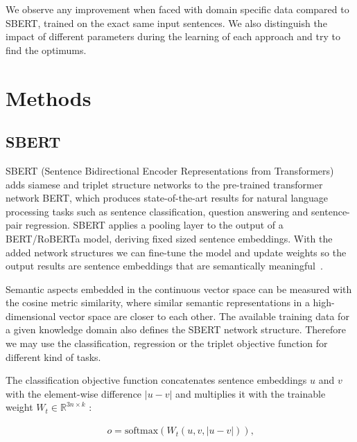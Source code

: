 \documentclass[fleqn,moreauthors,10pt]{ds_report}
\begin{document}
We observe any improvement when faced with domain specific data compared to SBERT, trained on the exact same input sentences. We also distinguish the impact of different parameters during the learning of each approach and try to find the optimums.






\section*{Methods}

\subsection*{SBERT}
SBERT (Sentence Bidirectional Encoder Representations from Transformers) adds siamese and triplet structure networks to the pre-trained transformer network BERT, which produces state-of-the-art results for natural language processing tasks such as sentence classification, question answering and sentence-pair regression. SBERT applies a pooling layer to the output of a BERT/RoBERTa model, deriving fixed sized sentence embeddings. With the added network structures we can fine-tune the model and update weights so the output results are sentence embeddings that are semantically meaningful~\cite{SBERT}.

Semantic aspects embedded in the continuous vector space can be measured with the cosine metric similarity, where similar semantic representations in a high-dimensional vector space are closer to each other. The available training data for a given knowledge domain also defines the SBERT network structure. Therefore we may use the classification, regression or the triplet objective function for different kind of tasks.

The classification objective function concatenates sentence embeddings \(u\) and \(v\) with the element-wise difference \(|u - v|\) and multiplies it with the trainable weight \( W_t \in \mathbb{R}^{3n \times k} \) \cite{SBERT}:

\begin{equation}
\begin{gathered}
o = \text{softmax}(W_t(u, v, |u - v|)) \text{,}
\end{gathered}
\label{eq:softmax}
\end{equation}
\end{document}
